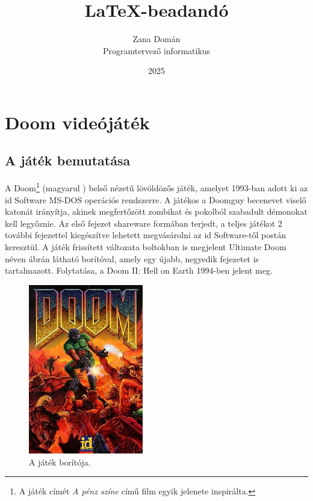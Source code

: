 \documentclass{thesis-ekf}
\theoremstyle{definition}
\begin{document}
\title{\LaTeX-beadandó}
\author{Zana Domán\\Programtervező informatikus}
\date{2025}
\maketitle

\tableofcontents

\chapter{Doom videójáték}

\section{A játék bemutatása}

A Doom\footnote{A játék címét \emph{A pénz színe} című film egyik jelenete
inspirálta.} (magyarul ) belső nézetű lövöldözős játék, amelyet
1993-ban adott ki az id Software MS-DOS operációs rendszerre. A játékos a
Doomguy becenevet viselő katonát irányítja, akinek megfertőzött zombikat és
pokolból szabadult démonokat kell legyőznie. Az első fejezet shareware formában
terjedt, a teljes játékot 2 további fejezettel kiegészítve lehetett megvásárolni
az id Software-től postán keresztül. A játék frissített változata boltokban is
megjelent Ultimate Doom néven  ábrán látható borítóval, amely
egy újabb, negyedik fejezetet is tartalmazott. Folytatása, a Doom II: Hell on
Earth 1994-ben jelent meg. \cite[Bevezető]{doomgame}

\begin{figure}[h]
    \centering
    \includegraphics[width=5cm]{doom.jpg}
    \caption{A játék borítója.}
    \label{fig:borito}
\end{figure}
\end{document}
